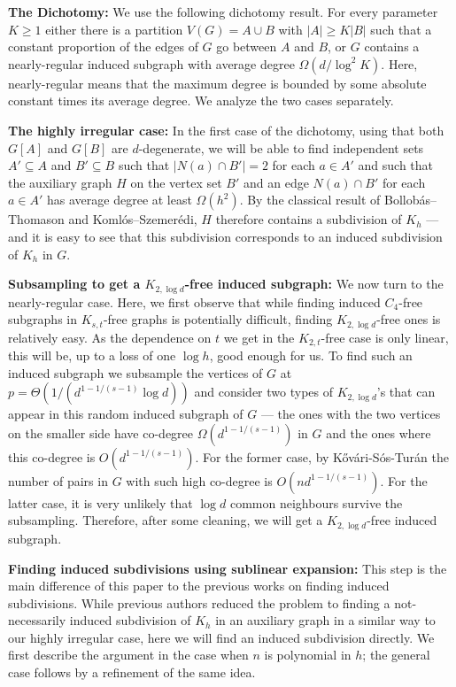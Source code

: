 \documentclass[10pt, a4paper]{article}
\numberwithin{theorem}{section} %
\theoremstyle{remark}
\theoremstyle{definition}
\begin{document}
\medskip
\noindent\textbf{The Dichotomy:} We use the following dichotomy result. 
For every parameter $K \geq 1$ either there is a partition $V(G) = A \cup B$ with $|A| \geq K|B|$ such that a constant proportion of the edges of $G$ go between $A$ and $B$, or $G$ contains a nearly-regular induced subgraph with average degree $\Omega(d/\log^2K)$.
Here, nearly-regular means that the maximum degree is bounded by some absolute constant times its average degree.
We analyze the two cases separately.

\medskip
\noindent\textbf{The highly irregular case:} In the first case of the dichotomy, using that both $G[A]$ and $G[B]$ are $d$-degenerate, we will be able to find independent sets $A' \subseteq A$ and $B' \subseteq B$ such that $|N(a) \cap B'| = 2$ for each $a \in A'$ and such that the auxiliary graph $H$ on the vertex set $B'$ and an edge $N(a)\cap B'$ for each $a \in A'$ has average degree at least $\Omega(h^2)$.
By the classical result of Bollob\'as--Thomason and Koml\'os--Szemer\'edi, $H$ therefore contains a subdivision of $K_h$ --- and it is easy to see that this subdivision corresponds to an induced subdivision of $K_h$ in $G$.

\medskip
\noindent\textbf{Subsampling to get a $K_{2, \log d}$-free induced subgraph:} We now turn to the nearly-regular case.
Here, we first observe that while finding induced $C_4$-free subgraphs in $K_{s,t}$-free graphs is potentially difficult, finding $K_{2, \log d}$-free ones is relatively easy.
As the dependence on $t$ we get in the $K_{2, t}$-free case is only linear, this will be, up to a loss of one $\log h$, good enough for us.
To find such an induced subgraph we subsample the vertices of $G$ at $p = \Theta(1/(d^{1 - 1/(s-1)}\log d))$ and consider two types of $K_{2, \log d}$'s that can appear in this random induced subgraph of $G$ --- the ones with the two vertices on the smaller side have co-degree $\Omega(d^{1 - 1/(s-1)})$ in $G$ and the ones where this co-degree is $O(d^{1 - 1/(s-1)})$.
For the former case, by K\H{o}v\'ari-S\'os-Tur\'an the number of pairs in $G$ with such high co-degree is $O(nd^{1 - 1/(s-1)})$.
For the latter case, it is very unlikely that $\log d$ common neighbours survive the subsampling.
Therefore, after some cleaning, we will get a $K_{2, \log d}$-free induced subgraph.

\medskip
\noindent\textbf{Finding induced subdivisions using sublinear expansion:}
This step is the main difference of this paper to the previous works on finding induced subdivisions.
While previous authors reduced the problem to finding a not-necessarily induced subdivision of $K_h$ in an auxiliary graph in a similar way to our highly irregular case, here we will find an induced subdivision directly.
We first describe the argument in the case when $n$ is polynomial in $h$; the general case follows by a refinement of the same idea.
\end{document}
